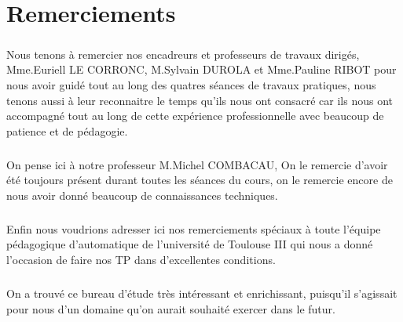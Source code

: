 \documentclass[12pt, a4paper, openany]{report}
\begin{document}
\chapter*{Remerciements}
  
  \paragraph{}
   Nous tenons à remercier nos encadreurs et professeurs de travaux dirigés, Mme.Euriell LE CORRONC, M.Sylvain DUROLA et Mme.Pauline RIBOT pour nous avoir guidé tout au long des quatres séances de travaux pratiques, nous tenons aussi à leur reconnaitre le temps qu'ils nous ont consacré car ils nous ont accompagné tout au long de cette expérience professionnelle avec beaucoup de patience et de pédagogie. \\ 
   
  \paragraph{}
   On pense ici à notre professeur M.Michel COMBACAU, On le remercie d’avoir été toujours présent durant toutes les séances du cours, on le remercie encore de nous avoir donné beaucoup de connaissances techniques.\\
 
  \paragraph{} 
   Enfin nous voudrions adresser ici nos remerciements spéciaux à toute l’équipe pédagogique d’automatique de l'université de Toulouse III qui nous a donné l’occasion de faire nos TP dans d'excellentes conditions.   \\

  \paragraph{}  
  On a trouvé ce bureau d’étude  très intéressant et enrichissant, puisqu’il s’agissait pour nous d’un domaine qu'on aurait souhaité exercer dans le futur. \\
   
\renewcommand{\contentsname}{Sommaire}
\tableofcontents
\listoffigures



%
%
%
%
%
%  
\end{document}
